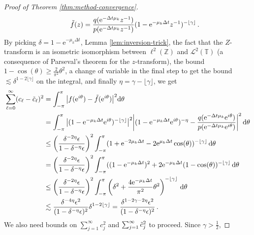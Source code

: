 \documentclass[12pt]{article} %
\newcommand{\dint}{\text{d}}
\begin{document}
\begin{proof}[Proof of Theorem \ref{thm:method-convergence}]
$$\qquad \Tilde{f}(z) = \frac{q(\mathrm{e}^{-\Delta t \mu_k} z^{ -1 })}{p(\mathrm{e}^{-\Delta t \mu_k} z^{ -1 })}(1 - \mathrm{e}^{-\mu_k \Delta t} z^{ -1 })^{-\lfloor \gamma \rfloor} \, .$$
%
By picking $\delta = 1 - \mathrm{e}^{- \mu_k \Delta t}$, Lemma \ref{lem:inversion-trick}, the fact that the $Z$-transform is an 
isometric 
 isomorphism  between $\ell^2(\mathbb{Z})$ and $\mathcal{L}^2(\mathbb{T})$ (a consequence of Parseval's theorem  for the $z$-transform), the bound $1 - \cos(\theta) \geq \frac{2}{\pi^2} \theta^2$, a change of variable in the final step to get the bound $\lesssim \delta^{1 - 2 \lfloor \gamma \rfloor}$ on the integral,  and finally $\eta=\gamma-\lfloor\gamma\rfloor$,  we get
%
\begin{align}
\sum_{\ell = 0}^\infty (c_\ell - \Tilde{c}_\ell)^2 &= \int_{-\pi}^{\pi} \big|f(\mathrm{e}^{i \theta}) - \Tilde{f}(\mathrm{e}^{i \theta})\big|^2 \dint \theta 
\nonumber\\
& = \int_{-\pi}^{\pi} \big|(1 - \mathrm{e}^{-\mu_k \Delta t} \mathrm{e}^{i \theta})^{-\lfloor \gamma \rfloor}\big|^2 \bigg|(1 - \mathrm{e}^{-\mu_k \Delta t} \mathrm{e}^{i \theta})^{-\eta} -\frac{q(\mathrm{e}^{-\Delta t \mu_k} \mathrm{e}^{i \theta})}{p(\mathrm{e}^{-\Delta t \mu_k} \mathrm{e}^{i \theta})} \bigg|^2 \, \dint \theta \nonumber\\
& \leq \left(\frac{\delta^{-2 \eta}\epsilon}{1 - \delta^{-\eta} \epsilon}\right)^2 \int_{-\pi}^{\pi} (1 + %
\mathrm{e}^{-2 \mu_k \Delta t} - 2 \mathrm{e}^{\mu_k \Delta t} \cos(\theta))^{-\lfloor \gamma \rfloor} \, \dint \theta \nonumber\\
& = \left(\frac{\delta^{-2 \eta}\epsilon}{1 - \delta^{-\eta} \epsilon}\right)^2 \int_{-\pi}^{\pi} ((1 - \mathrm{e}^{-\mu_k \Delta t})^2 + 2 \mathrm{e}^{-%
\mu_k \Delta t} (1 - \cos(\theta))^{-\lfloor \gamma \rfloor} \, \dint \theta \nonumber\\
& \leq \left(\frac{\delta^{-2 \eta}\epsilon}{1 - \delta^{-\eta} \epsilon}\right)^2 \int_{-\pi}^{\pi} \left(\delta^2 + \frac{4 \mathrm{e}^{-%
\mu_k \Delta t}}{\pi^2} \theta^2 \right)^{-\lfloor \gamma \rfloor} \, \dint \theta \nonumber\\
& \lesssim \frac{\delta^{-4 \eta} \epsilon^2}{(1 - \delta^{-\eta} \epsilon)^2} \delta^{1 - 2 \lfloor \gamma \rfloor} = \frac{\delta^{1 - 2\gamma - 2
\eta}\epsilon^2}{(1 - \delta^{-\eta} \epsilon)^2} \, .\label{c-c}
\end{align}
 We also need bounds on $\sum_{j = 1}^\infty c_j^2$ and $\sum_{j = 1}^\infty \Tilde{c}_j^2$ to proceed.
Since $\gamma>\tfrac12$, 

\end{proof}
\end{document}
